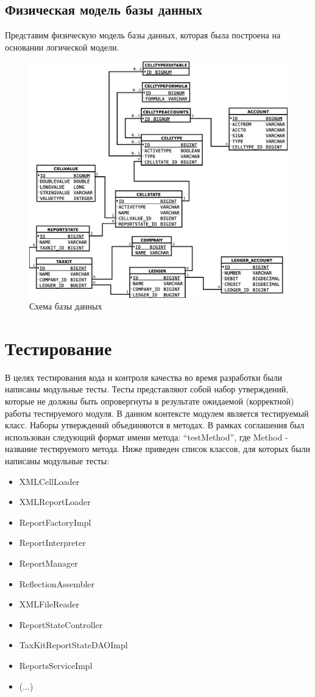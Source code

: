 \documentclass[14pt,a4paper]{reportmod}
\begin{document}
\subsection{Физическая модель базы данных}
Представим физическую модель базы данных, которая была построена на основании логической модели.
\begin{figure}
  \centering
  \includegraphics[scale=0.4]{uml/database}
  \caption{Схема базы данных}
  \label{pic:database}
\end{figure}

\section{Тестирование}
В целях тестирования кода и контроля качества во время разработки были написаны модульные тесты. Тесты представляют собой набор утверждений, которые не должны быть опровергнуты в результате ожидаемой (корректной) работы тестируемого модуля. В данном контексте модулем является тестируемый класс. Наборы утверждений объединяются в методах. В рамках соглашения был использован следующий формат имени метода: ``testMethod'', где Method - название тестируемого метода.
Ниже приведен список классов, для которых были написаны модульные тесты:
\begin{itemize}
  \item XMLCellLoader
  \item XMLReportLoader
  \item ReportFactoryImpl
  \item ReportInterpreter
  \item ReportManager
  \item ReflectionAssembler
  \item XMLFileReader
  \item ReportStateController
  \item TaxKitReportStateDAOImpl
  \item ReportsServiceImpl
  \item (...)
\end{itemize}
\end{document}
